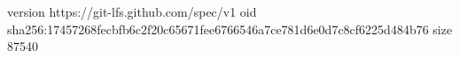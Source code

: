 version https://git-lfs.github.com/spec/v1
oid sha256:17457268fecbfb6c2f20c65671fee6766546a7ce781d6e0d7c8cf6225d484b76
size 87540

